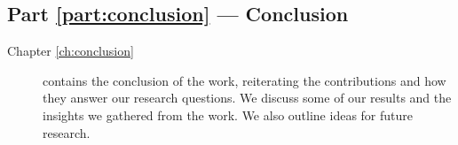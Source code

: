 \subsection*{Part \ref{part:conclusion} --- Conclusion}

\begin{description}
 \item[Chapter \ref{ch:conclusion}] contains the conclusion of the work, reiterating the contributions and how they answer our research questions. We discuss some of our results and the insights we gathered from the work. We also outline ideas for future research.
\end{description}
